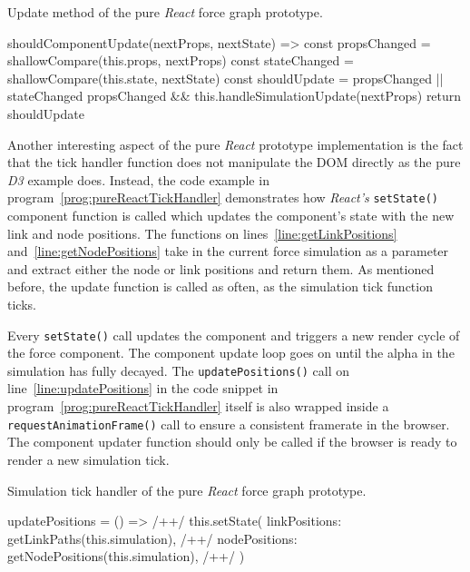 \begin{program}
\caption{Update method of the pure \emph{React} force graph prototype.}
\label{prog:pureReactSimulationUpdate}
\begin{JsCode}
shouldComponentUpdate(nextProps, nextState) => {
  const propsChanged = shallowCompare(this.props, nextProps)
  const stateChanged = shallowCompare(this.state, nextState)
  const shouldUpdate = propsChanged || stateChanged
  propsChanged && this.handleSimulationUpdate(nextProps)
  return shouldUpdate
}
\end{JsCode}
\end{program}

Another interesting aspect of the pure \emph{React} prototype implementation is the fact that the tick handler function does not manipulate the DOM directly as the pure \emph{D3} example does. Instead, the code example in program~\ref{prog:pureReactTickHandler} demonstrates how \emph{React's} \texttt{setState()} component function is called which updates the component's state with the new link and node positions. The functions on lines~\ref{line:getLinkPositions} and~\ref{line:getNodePositions} take in the current force simulation as a parameter and extract either the node or link positions and return them. As mentioned before, the update function is called as often, as the simulation tick function ticks. 

Every \texttt{setState()} call updates the component and triggers a new render cycle of the force component. The component update loop goes on until the alpha in the simulation has fully decayed. The \texttt{updatePositions()} call on line~\ref{line:updatePositions} in the code snippet in program~\ref{prog:pureReactTickHandler} itself is also wrapped inside a \texttt{requestAnimationFrame()} call to ensure a consistent framerate in the browser. The component updater function should only be called if the browser is ready to render a new simulation tick.

\begin{program}
\caption{Simulation tick handler of the pure \emph{React} force graph prototype.}
\label{prog:pureReactTickHandler}
\begin{JsCode}
updatePositions = () => { /+\label{line:updatePositions}+/
  this.setState({
    linkPositions: getLinkPaths(this.simulation), /+\label{line:getLinkPositions}+/
    nodePositions: getNodePositions(this.simulation), /+\label{line:getNodePositions}+/
  })
}
\end{JsCode}
\end{program}

